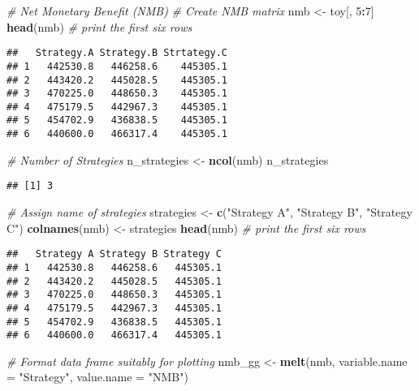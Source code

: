 \documentclass[
]{article}
\newenvironment{Shaded}{\begin{snugshade}}{\end{snugshade}}
\newcommand{\CommentTok}[1]{\textcolor[rgb]{0.56,0.35,0.01}{\textit{#1}}}
\newcommand{\DataTypeTok}[1]{\textcolor[rgb]{0.13,0.29,0.53}{#1}}
\newcommand{\DecValTok}[1]{\textcolor[rgb]{0.00,0.00,0.81}{#1}}
\newcommand{\KeywordTok}[1]{\textcolor[rgb]{0.13,0.29,0.53}{\textbf{#1}}}
\newcommand{\NormalTok}[1]{#1}
\newcommand{\OperatorTok}[1]{\textcolor[rgb]{0.81,0.36,0.00}{\textbf{#1}}}
\newcommand{\StringTok}[1]{\textcolor[rgb]{0.31,0.60,0.02}{#1}}
\begin{document}
\begin{Shaded}
\begin{Highlighting}[]
\CommentTok{# Net Monetary Benefit (NMB) }
\CommentTok{# Create NMB matrix}
\NormalTok{nmb <-}\StringTok{ }\NormalTok{toy[, }\DecValTok{5}\OperatorTok{:}\DecValTok{7}\NormalTok{]}
\KeywordTok{head}\NormalTok{(nmb) }\CommentTok{# print the first six rows }
\end{Highlighting}
\end{Shaded}

\begin{verbatim}
##   Strategy.A Strategy.B Strtategy.C
## 1   442530.8   446258.6    445305.1
## 2   443420.2   445028.5    445305.1
## 3   470225.0   448650.3    445305.1
## 4   475179.5   442967.3    445305.1
## 5   454702.9   436838.5    445305.1
## 6   440600.0   466317.4    445305.1
\end{verbatim}

\begin{Shaded}
\begin{Highlighting}[]
\CommentTok{# Number of Strategies}
\NormalTok{n_strategies <-}\StringTok{ }\KeywordTok{ncol}\NormalTok{(nmb)}
\NormalTok{n_strategies}
\end{Highlighting}
\end{Shaded}

\begin{verbatim}
## [1] 3
\end{verbatim}

\begin{Shaded}
\begin{Highlighting}[]
\CommentTok{# Assign name of strategies}
\NormalTok{strategies    <-}\StringTok{ }\KeywordTok{c}\NormalTok{(}\StringTok{"Strategy A"}\NormalTok{, }\StringTok{"Strategy B"}\NormalTok{, }\StringTok{"Strategy C"}\NormalTok{)}
\KeywordTok{colnames}\NormalTok{(nmb) <-}\StringTok{ }\NormalTok{strategies}
\KeywordTok{head}\NormalTok{(nmb)  }\CommentTok{# print the first six rows }
\end{Highlighting}
\end{Shaded}

\begin{verbatim}
##   Strategy A Strategy B Strategy C
## 1   442530.8   446258.6   445305.1
## 2   443420.2   445028.5   445305.1
## 3   470225.0   448650.3   445305.1
## 4   475179.5   442967.3   445305.1
## 5   454702.9   436838.5   445305.1
## 6   440600.0   466317.4   445305.1
\end{verbatim}

\begin{Shaded}
\begin{Highlighting}[]
\CommentTok{# Format data frame suitably for plotting}
\NormalTok{nmb_gg <-}\StringTok{ }\KeywordTok{melt}\NormalTok{(nmb,  }
               \DataTypeTok{variable.name =} \StringTok{"Strategy"}\NormalTok{, }
               \DataTypeTok{value.name =} \StringTok{"NMB"}\NormalTok{)}
\end{Highlighting}
\end{Shaded}
\end{document}

